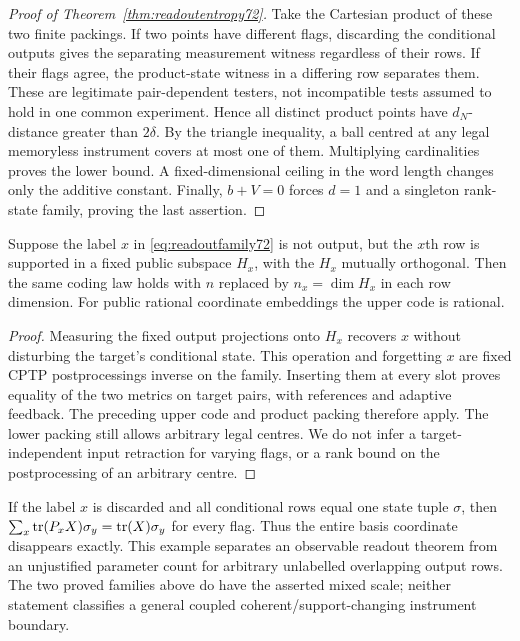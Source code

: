 \begin{proof}[Proof of Theorem~\ref{thm:readoutentropy72}]
Take the Cartesian product of these two finite packings. If two
points have different flags, discarding the conditional outputs gives
the separating measurement witness regardless of their rows. If their
flags agree, the product-state witness in a differing row separates
them. These are legitimate pair-dependent testers, not incompatible
tests assumed to hold in one common experiment. Hence all distinct
product points have $d_N$-distance greater than $2\delta$. By the
triangle inequality, a ball centred at any legal memoryless instrument
covers at most one of them. Multiplying cardinalities proves the
lower bound. A fixed-dimensional ceiling in the word length changes
only the additive constant. Finally, $b+V=0$ forces $d=1$ and a
singleton rank-state family, proving the last assertion.
\end{proof}

\begin{corollary}\label{cor:observablereadout72}
Suppose the label $x$ in \eqref{eq:readoutfamily72} is not output,
but the $x$th row is supported in a fixed public subspace $H_x$,
with the $H_x$ mutually orthogonal. Then the same coding law holds
with $n$ replaced by $n_x=\dim H_x$ in each row dimension. For
public rational coordinate embeddings the upper code is rational.
\end{corollary}
\begin{proof}
Measuring the fixed output projections onto $H_x$ recovers $x$
without disturbing the target's conditional state. This operation
and forgetting $x$ are fixed CPTP postprocessings inverse on the
family. Inserting them at every slot proves equality of the two
metrics on target pairs, with references and adaptive feedback.
The preceding upper code and product packing therefore apply. The
lower packing still allows arbitrary legal centres. We do not infer
a target-independent input retraction for varying flags, or a rank
bound on the postprocessing of an arbitrary centre.
\end{proof}

\begin{remark}\label{rem:unflagged72}
If the label $x$ is discarded and all conditional rows equal one
state tuple $\sigma$, then
$\sum_x\operatorname{tr}(P_xX)\sigma_y=\operatorname{tr}(X)\sigma_y$ for every flag.
Thus the entire basis coordinate disappears exactly. This example
separates an observable readout theorem from an unjustified parameter
count for arbitrary unlabelled overlapping output rows. The two
proved families above do have the asserted mixed scale; neither
statement classifies a general coupled coherent/support-changing
instrument boundary.
\end{remark}
